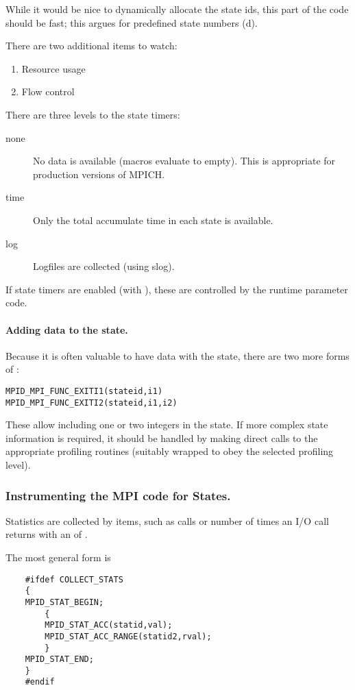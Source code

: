 \documentclass{article}
\begin{document}
While it would be nice to dynamically allocate the state ids, this part of the
code should be fast; this argues for predefined state numbers
(d).  

There are two additional items to watch:
\begin{enumerate}
\item Resource usage
\item Flow control
\end{enumerate}

There are three levels to the state timers:
\begin{description}
\item[none]No data is available (macros evaluate to empty).  This is
  appropriate for production versions of MPICH.
\item[time]Only the total accumulate time in each state is available.
\item[log]Logfiles are collected (using slog).
\end{description}
If state timers are enabled (with ), these are
controlled by the runtime parameter code.

\paragraph{Adding data to the state.}
Because it is often valuable to have data with the state, there are
two more forms of :
\begin{verbatim}
MPID_MPI_FUNC_EXITI1(stateid,i1)
MPID_MPI_FUNC_EXITI2(stateid,i1,i2)
\end{verbatim}
These allow including one or two integers in the state.  If more
complex state information is required, it should be handled by making
direct calls to the appropriate profiling routines (suitably wrapped
to obey the selected profiling level).

\subsubsection{Instrumenting the MPI code for States.}
Statistics are collected by items, such as  calls or
number of times an I/O call returns with an  of
.  

The most general form is
\begin{verbatim}
    #ifdef COLLECT_STATS
    {
    MPID_STAT_BEGIN;
        {
        MPID_STAT_ACC(statid,val);
        MPID_STAT_ACC_RANGE(statid2,rval);
        }
    MPID_STAT_END;
    }
    #endif
\end{verbatim}
\end{document}
